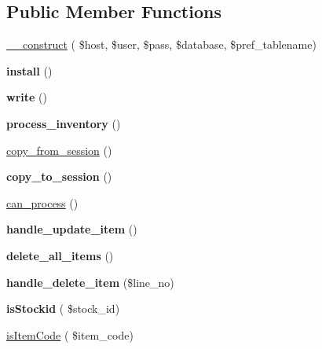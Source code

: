 \subsection*{Public Member Functions}
\begin{DoxyCompactItemize}
\item 
\hyperlink{class_inventory_a3d94ae6f942f9c10ba12a75b57ec1d43}{\+\_\+\+\_\+construct} ( \$host, \$user, \$pass, \$database, \$pref\+\_\+tablename)
\item 
\hypertarget{class_inventory_a8e1cc8e71fe7c1340e246f23a9c14b7a}{}\label{class_inventory_a8e1cc8e71fe7c1340e246f23a9c14b7a} 
{\bfseries install} ()
\item 
\hypertarget{class_inventory_aabb97aaa0e58e324b6077cc0a5593384}{}\label{class_inventory_aabb97aaa0e58e324b6077cc0a5593384} 
{\bfseries write} ()
\item 
\hypertarget{class_inventory_a1c90cc40b9139610f3db802b67d7c211}{}\label{class_inventory_a1c90cc40b9139610f3db802b67d7c211} 
{\bfseries process\+\_\+inventory} ()
\item 
\hyperlink{class_inventory_a47208c8f736cae33d5293f0c160266cb}{copy\+\_\+from\+\_\+session} ()
\item 
\hypertarget{class_inventory_a5d05f6203e1f1d0d26b4ad1a6ee416b0}{}\label{class_inventory_a5d05f6203e1f1d0d26b4ad1a6ee416b0} 
{\bfseries copy\+\_\+to\+\_\+session} ()
\item 
\hyperlink{class_inventory_a05cfd3bab20f8d1d40a8f83beb23d694}{can\+\_\+process} ()
\item 
\hypertarget{class_inventory_afe4428608c97c76ee1e5f7bbd6ce4083}{}\label{class_inventory_afe4428608c97c76ee1e5f7bbd6ce4083} 
{\bfseries handle\+\_\+update\+\_\+item} ()
\item 
\hypertarget{class_inventory_a9460265e3641d0fa9f14fe584d2369c0}{}\label{class_inventory_a9460265e3641d0fa9f14fe584d2369c0} 
{\bfseries delete\+\_\+all\+\_\+items} ()
\item 
\hypertarget{class_inventory_a509402207c6adb506bbd9a22a15415e9}{}\label{class_inventory_a509402207c6adb506bbd9a22a15415e9} 
{\bfseries handle\+\_\+delete\+\_\+item} (\$line\+\_\+no)
\item 
\hypertarget{class_inventory_ac66fe979ed1b2d30e64972356757df8c}{}\label{class_inventory_ac66fe979ed1b2d30e64972356757df8c} 
{\bfseries is\+Stockid} ( \$stock\+\_\+id)
\item 
\hyperlink{class_inventory_ac788e157a403fd8192b4dd2eedf57378}{is\+Item\+Code} ( \$item\+\_\+code)
\item 
\hypertarget{class_inventory_a56d65f3277dff3761e841f2c0a7909d2}{}\label{class_inventory_a56d65f3277dff3761e841f2c0a7909d2} 

\end{DoxyCompactItemize}
